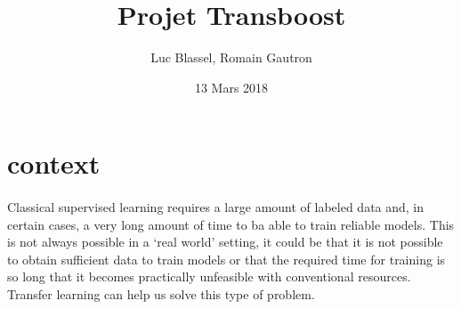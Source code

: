 \documentclass[11 pt]{article}
\title{Projet Transboost}
\author{Luc Blassel, Romain Gautron}
\date{13 Mars 2018}
\begin{document}
\maketitle

\tableofcontents
\newpage

\section{context}
\paragraph{}Classical supervised learning requires a large amount of labeled data and, in certain cases, a very long amount of time to ba able to train reliable models. This is not always possible in a `real world' setting, it could be that it is not possible to obtain sufficient data to train models or that the required time for training is so long that it becomes practically unfeasible with conventional resources. Transfer learning can help us solve this type of problem. 

\end{document}
